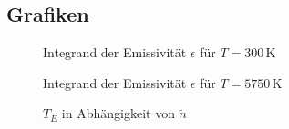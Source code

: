 \documentclass[10pt,a4paper]{article}
\begin{document}
\begin{appendix}
\section{Grafiken}

\begin{figure}[htbp]
\centering

\caption{Integrand der Emissivität $\epsilon$ für $T=300\, \si{\kelvin}$}
\label{fig:integrand300}
\end{figure}

\begin{figure}
\centering

\caption{Integrand der Emissivität $\epsilon$ für $T=5750\, \si{\kelvin}$}
\label{fig:integrand5750}
\end{figure}

\begin{figure}
\centering

\caption{$T_E$ in Abhängigkeit von $\tilde{n}$}
\label{fig:ergebnisse}
\end{figure}
\end{appendix}
\end{document}

